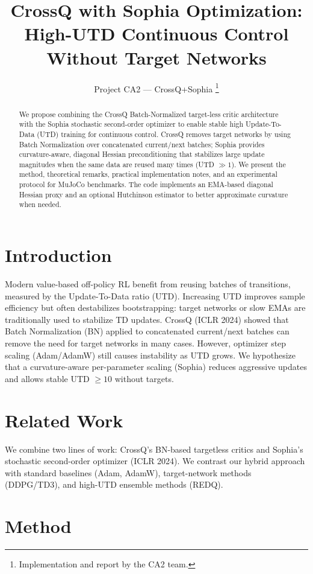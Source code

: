 \documentclass{article}
\title{CrossQ with Sophia Optimization: High-UTD Continuous Control Without Target Networks}
\author{Project CA2 — CrossQ+Sophia \thanks{Implementation and report by the CA2 team.}}
\date{}
\begin{document}
\maketitle

\begin{abstract}
We propose combining the CrossQ Batch-Normalized target-less critic architecture with the Sophia stochastic second-order optimizer to enable stable high Update-To-Data (UTD) training for continuous control. CrossQ removes target networks by using Batch Normalization over concatenated current/next batches; Sophia provides curvature-aware, diagonal Hessian preconditioning that stabilizes large update magnitudes when the same data are reused many times (UTD $\gg 1$). We present the method, theoretical remarks, practical implementation notes, and an experimental protocol for MuJoCo benchmarks. The code implements an EMA-based diagonal Hessian proxy and an optional Hutchinson estimator to better approximate curvature when needed.
\end{abstract}

\section{Introduction}
Modern value-based off-policy RL benefit from reusing batches of transitions, measured by the Update-To-Data ratio (UTD). Increasing UTD improves sample efficiency but often destabilizes bootstrapping: target networks or slow EMAs are traditionally used to stabilize TD updates. CrossQ (ICLR 2024) showed that Batch Normalization (BN) applied to concatenated current/next batches can remove the need for target networks in many cases. However, optimizer step scaling (Adam/AdamW) still causes instability as UTD grows. We hypothesize that a curvature-aware per-parameter scaling (Sophia) reduces aggressive updates and allows stable UTD $\ge 10$ without targets.

\section{Related Work}
We combine two lines of work: CrossQ's BN-based targetless critics and Sophia's stochastic second-order optimizer (ICLR 2024). We contrast our hybrid approach with standard baselines (Adam, AdamW), target-network methods (DDPG/TD3), and high-UTD ensemble methods (REDQ).

\section{Method}
\end{document}

